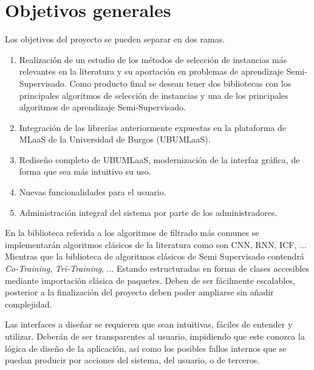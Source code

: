 \newpage
\section{Objetivos generales}\label{objetivos-generales}
Los objetivos del proyecto se pueden separar en dos ramas.
\begin{enumerate}
\item Realización de un estudio de los métodos de selección de instancias más relevantes en la literatura y su aportación en problemas de aprendizaje Semi-Supervisado. Como producto final se desean tener dos bibliotecas con los principales algoritmos de selección de instancias y una de los principales algoritmos de aprendizaje Semi-Supervisado.
\item Integración de las librerías anteriormente expuestas en la plataforma de MLaaS de la Universidad de Burgos (UBUMLaaS).
\item Rediseño completo de UBUMLaaS, modernización de la interfaz gráfica, de forma que sea más intuitivo su uso.
\item Nuevas funcionalidades para el usuario.
\item Administración integral del sistema por parte de los administradores.
\end{enumerate}

En la biblioteca referida a los algoritmos de filtrado más comunes se implementarán algoritmos clásicos de la literatura como son CNN, RNN, ICF, ... Mientras que la biblioteca de algoritmos clásicos de Semi Supervisado contendrá \textit{Co-Training}, \textit{Tri-Training}, ... Estando estructuradas en forma de clases accesibles mediante importación clásica de paquetes. Deben de ser fácilmente escalables, posterior a la finalización del proyecto deben poder ampliarse sin añadir complejidad.

Las interfaces a diseñar se requieren que sean intuitivas, fáciles de entender y utilizar. Deberán de ser transparentes al usuario, impidiendo que este conozca la lógica de diseño de la aplicación, así como los posibles fallos internos que se puedan producir por acciones del sistema, del usuario, o de terceros.

\newpage
